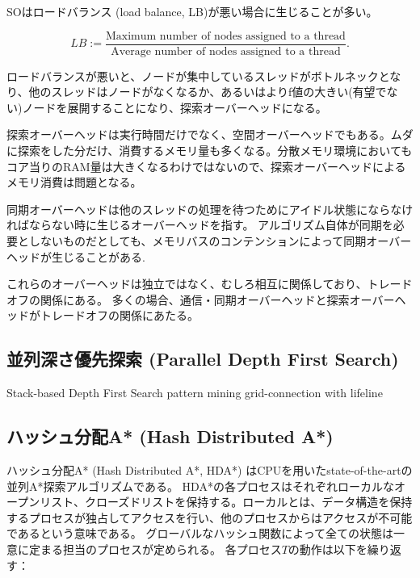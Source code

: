 \documentclass[10pt]{book}
\begin{document}
SOはロードバランス (load balance, LB)が悪い場合に生じることが多い。

\begin{equation}
LB := \frac{\text{Maximum number of nodes assigned to a thread}}{\text{Average number of nodes assigned to a thread}}.
\end{equation}

ロードバランスが悪いと、ノードが集中しているスレッドがボトルネックとなり、他のスレッドはノードがなくなるか、あるいはよりf値の大きい(有望でない)ノードを展開することになり、探索オーバーヘッドになる。

探索オーバーヘッドは実行時間だけでなく、空間オーバーヘッドでもある。ムダに探索をした分だけ、消費するメモリ量も多くなる。分散メモリ環境においてもコア当りのRAM量は大きくなるわけではないので、探索オーバーヘッドによるメモリ消費は問題となる。


同期オーバーヘッドは他のスレッドの処理を待つためにアイドル状態にならなければならない時に生じるオーバーヘッドを指す。
アルゴリズム自体が同期を必要としないものだとしても、メモリバスのコンテンションによって同期オーバーヘッドが生じることがある\cite{burnslrz10,kishimotofb13}.


これらのオーバーヘッドは独立ではなく、むしろ相互に関係しており、トレードオフの関係にある。
多くの場合、通信・同期オーバーヘッドと探索オーバーヘッドがトレードオフの関係にあたる。


\subsection{並列深さ優先探索 (Parallel Depth First Search)}
\label{sec:parallel-dfs}
Stack-based Depth First Search
pattern mining
grid-connection with lifeline

\subsection{ハッシュ分配A* (Hash Distributed A*)}
\label{sec:hash-distributed-astar}

ハッシュ分配A* (Hash Distributed A*, HDA*) \cite{kishimotofb13}はCPUを用いたstate-of-the-artの並列A*探索アルゴリズムである。
HDA*の各プロセスはそれぞれローカルなオープンリスト、クローズドリストを保持する。ローカルとは、データ構造を保持するプロセスが独占してアクセスを行い、他のプロセスからはアクセスが不可能であるという意味である。
グローバルなハッシュ関数によって全ての状態は一意に定まる担当のプロセスが定められる。
各プロセス$T$の動作は以下を繰り返す：
\end{document}
